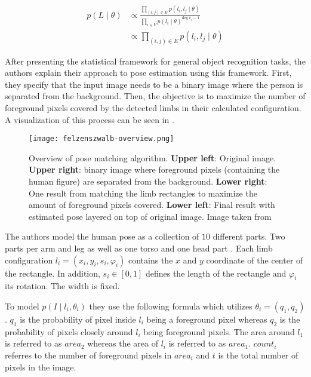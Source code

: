 \begin{equation}
    \begin{split}
        p(L \mid \theta) 
        &\propto \frac{\prod_{(i,j) \in E} p(l_i, l_j \mid \theta)}{\prod_{i \in V} p(l_i \mid \theta)^{\text{deg} ~ v_i -1}} \\
        &\propto \prod_{(i, j) \in E} p(l_i, l_j \mid \theta)
    \end{split}
\end{equation}


After presenting the statistical framework for general object recognition tasks, the authors explain their approach to pose estimation using this framework.
First, they specify that the input image needs to be a binary image where the person is separated from the background.
Then, the objective is to maximize the number of foreground pixels covered by the detected limbs in their calculated configuration.
A visualization of this process can be seen in .

\begin{figure}[htb!]
    \centering
    \texttt{[image: felzenszwalb-overview.png]}
    \caption{Overview of pose matching algorithm. \textbf{Upper left}: Original image. \textbf{Upper right}: binary image where foreground pixels (containing the human figure) are separated from the background. \textbf{Lower right}: One result from matching the limb rectangles to maximize the amount of foreground pixels covered. \textbf{Lower left}: Final result with estimated pose layered on top of original image. Image taken from \cite{felzenszwalb_pictorial_2005}}
    \label{fig:felzenszwalb-overview}
\end{figure}

The authors model the human pose as a collection of $10$ different parts. 
Two parts per arm and leg as well as one torso and one head part .
Each limb configuration $l_i = (x_i, y_i, s_i , \varphi_i)$ contains the $x$ and $y$ coordinate of the center of the rectangle.
In addition, $s_i \in [0,1]$ defines the length of the rectangle and $\varphi_i$ its rotation.
The width is fixed.

To model $p(I \mid l_i, \theta_i)$ they use the following formula which utilizes $\theta_i = (q_1, q_2)$.
$q_1$ is the probability of pixel inside $l_i$ being a foreground pixel whereas $q_2$ is the probability of pixels closely around $l_i$ being foreground pixels.
The area around $l_1$ is referred to as $area_2$ whereas the area of $l_i$ is referred to as $area_1$.
$count_i$ referres to the number of foreground pixels in $area_i$ and $t$ is the total number of pixels in the image.

